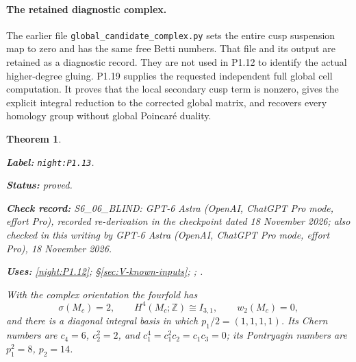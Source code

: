 \documentclass[11pt,a4paper]{article}
\newtheorem{theorem}{Theorem}[section]
\theoremstyle{definition}
\newcommand{\StatementRecord}[4]{\par\smallskip\begingroup\upshape\raggedright\noindent\textbf{Label:} \nolinkurl{#1}.\par\noindent\textbf{Status:} #2.\par\noindent\textbf{Check record:} #3.\par\noindent\textbf{Uses:} #4.\par\endgroup\smallskip}
\newcommand{\CurrentChecker}{GPT-6 Astra (OpenAI, ChatGPT Pro mode, effort Pro), 18 November 2026}
\begin{document}
\paragraph{The retained diagnostic complex.}
The earlier file \texttt{global\_candidate\_complex.py} sets the entire
cusp suspension map to zero and has the same free Betti numbers.
That file and its output are retained as a diagnostic record.  They
are not used in P1.12 to identify the actual higher-degree gluing.
P1.19 supplies the requested independent full global cell computation.
It proves that the local secondary cusp term is nonzero, gives the
explicit integral reduction to the corrected global matrix, and
recovers every homology group without global Poincar\'e duality.

\begin{theorem}\label{night:P1.13}
\StatementRecord{night:P1.13}{proved}{S6\_06\_BLIND: GPT-6 Astra (OpenAI, ChatGPT Pro mode, effort Pro), recorded re-derivation in the checkpoint dated 18 November 2026; also checked in this writing by \CurrentChecker}{\cref{night:P1.12}; \S\ref{sec:V-known-inputs}; \cite[equations (1.2)--(1.4), pp.~3--4]{ffEsoleKang}; \cite[Theorem 2.2.1, p.~61]{ffPetersSterk}}
With the complex orientation the fourfold has
\[
\sigma(M_c)=2,\qquad H^4(M_c;\mathbb Z)\cong I_{3,1},\qquad
w_2(M_c)=0,
\]
and there is a diagonal integral basis in which
$p_1/2=(1,1,1,1)$.
Its Chern numbers are
$c_4=6$, $c_2^2=2$, and
$c_1^4=c_1^2c_2=c_1c_3=0$; its Pontryagin numbers are
$p_1^2=8$, $p_2=14$.
\end{theorem}
\end{document}
